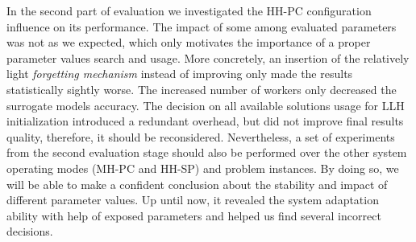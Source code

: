 In the second part of evaluation we investigated the HH-PC configuration influence on its performance. The impact of some among evaluated parameters was not as we expected, which only motivates the importance of a proper parameter values search and usage. More concretely, an insertion of the relatively light \emph{forgetting mechanism} instead of improving only made the results statistically sightly worse. The increased number of workers only decreased the surrogate models accuracy. The decision on all available solutions usage for LLH initialization introduced a redundant overhead, but did not improve final results quality, therefore, it should be reconsidered. Nevertheless, a set of experiments from the second evaluation stage should also be performed over the other system operating modes (MH-PC and HH-SP) and problem instances. By doing so, we will be able to make a confident conclusion about the stability and impact of different parameter values. Up until now, it revealed the system adaptation ability with help of exposed parameters and helped us find several incorrect decisions.
